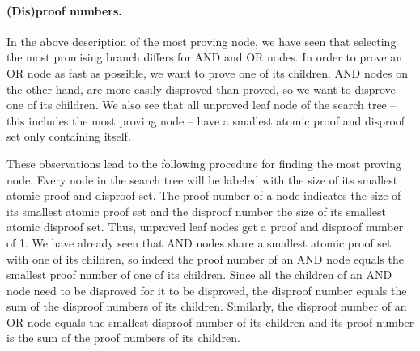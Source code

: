 \documentclass[a4paper, 11pt]{article}
\begin{document}
\paragraph{(Dis)proof numbers.}
In the above description of the most proving node, we have seen that selecting the most promising branch differs for AND and OR nodes.
In order to prove an OR node as fast as possible, we want to prove one of its children. AND nodes on the other hand, are more easily disproved than
proved, so we want to disprove one of its children. We also see that all unproved leaf node of the search tree -- this includes the most proving
node -- have a smallest atomic proof and disproof set only containing itself.

These observations lead to the following procedure for finding the most proving node. Every node in the search tree will be labeled with the
size of its smallest atomic proof and disproof set. The proof number of a node indicates the size of its smallest atomic proof set and the disproof number
the size of its smallest atomic disproof set. Thus, unproved leaf nodes get a proof and disproof number of 1. We have already seen that AND nodes share
a smallest atomic proof set with one of its children, so indeed the proof number of an AND node equals the smallest proof number of one of
its children. Since all the children of an AND node need to be disproved for it to be disproved, the disproof number equals the sum of the disproof
numbers of its children. Similarly, the disproof number of an OR node equals the smallest disproof number of its children and its proof number
is the sum of the proof numbers of its children.
\end{document}
